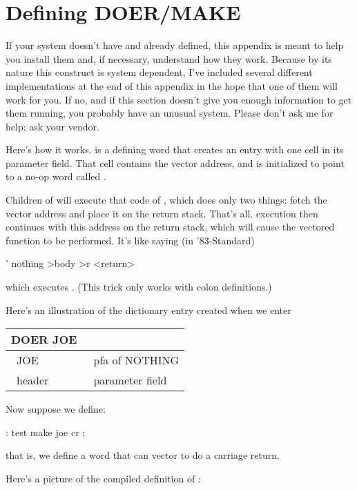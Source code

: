 \chapter{Defining
DOER/MAKE}
\initial If your system doesn't have  and 
already defined, this appendix is meant to help you install them and,
if necessary, understand how they work.  Because by its nature this
construct is system dependent, I've included several different
implementations at the end of this appendix in the hope that one of
them will work for you.  If no, and if this section doesn't give you
enough information to get them running, you probably have an unusual
system.  Please don't ask me for help; ask your \Forth{} vendor.

Here's how it works.   is a defining word that creates an
entry with one cell in its parameter field. That cell contains the vector
address, and is initialized to point to a no-op word called
.

Children of  will execute that  code of
, which does only two things:  fetch the vector address and
place it on the return stack.  That's all.  \Forth{} execution then
continues with this address on the return stack, which will cause the
vectored function to be performed.  It's like saying (in '83-Standard)
\begin{Code}
' nothing >body >r <return>
\end{Code}
which executes .  (This trick only works with colon
definitions.)

Here's an illustration of the dictionary entry created when we enter

{\sf
\bigskip
\begin{tabular}{@{} l l@{}}
DOER JOE & \\
\hline
\vline\ JOE & \vline\ pfa of NOTHING \vline \\
\hline
\ header &\  parameter field
\end{tabular}
\bigskip
}

\noindent Now suppose we define:
\begin{Code}
: test   make joe  cr ;
\end{Code}
that is, we define a word that can vector  to do a carriage
return.

Here's a picture of the compiled definition of :


